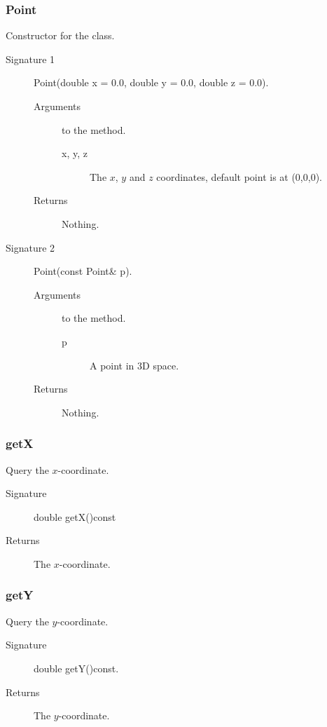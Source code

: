 \subsubsection{Point}
Constructor for the class. 
\begin{description}
  \item[Signature 1] Point(double x = 0.0, double y = 0.0, double z = 0.0).
  \begin{description}
  \item[Arguments] to the method.
   \begin{description}
      \item[x, y, z] The $x$, $y$ and $z$ coordinates, 
                     default point is at (0,0,0).
   \end{description}
  \item[Returns] Nothing.
  \end{description}
  \item[Signature 2] Point(const Point\& p).
   \begin{description}
  \item[Arguments] to the method.
   \begin{description}
      \item[p] A point in 3D space.
   \end{description}
  \item[Returns] Nothing.
  \end{description}
\end{description}


\subsubsection{getX}
Query the $x$-coordinate.
\begin{description}
  \item[Signature] double getX()const
  \item[Returns] The $x$-coordinate.
\end{description}

\subsubsection{getY}
Query the $y$-coordinate. 
\begin{description}
  \item[Signature] double getY()const.
  \item[Returns] The $y$-coordinate.
\end{description}

